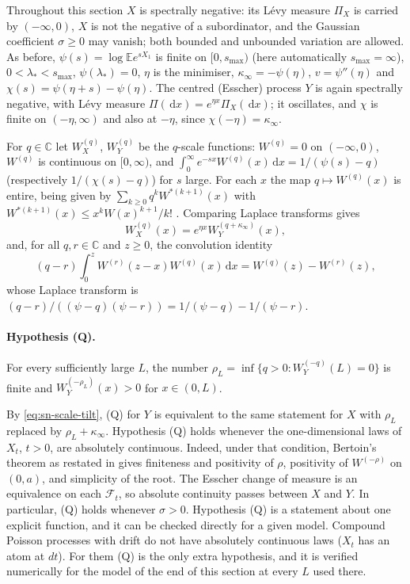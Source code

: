 \documentclass[11pt,a4paper]{article}
\theoremstyle{definition}
\theoremstyle{remark}
\newcommand{\E}{\mathbb E}
\newcommand{\1}{\mathbf 1}
\newcommand{\dd}{\,\mathrm d}
\begin{document}
Throughout this section $X$ is spectrally negative: its L\'evy measure $\Pi_X$ is carried by $(-\infty,0)$, $X$ is not the negative of a subordinator, and the Gaussian coefficient $\sigma\geq0$ may vanish; both bounded and unbounded variation are allowed. As before, $\psi(s)=\log\E e^{sX_1}$ is finite on $[0,s_{\max})$ (here automatically $s_{\max}=\infty$), $0<\lambda_*<s_{\max}$, $\psi(\lambda_*)=0$, $\eta$ is the minimiser, $\kappa_\infty=-\psi(\eta)$, $v=\psi''(\eta)$ and $\chi(s)=\psi(\eta+s)-\psi(\eta)$. The centred (Esscher) process $Y$ is again spectrally negative, with L\'evy measure $\Pi(\dd x)=e^{\eta x}\Pi_X(\dd x)$; it oscillates, and $\chi$ is finite on $(-\eta,\infty)$ and also at $-\eta$, since $\chi(-\eta)=\kappa_\infty$.

For $q\in\mathbb C$ let $W_X^{(q)}$, $W_Y^{(q)}$ be the $q$-scale functions: $W^{(q)}=0$ on $(-\infty,0)$, $W^{(q)}$ is continuous on $[0,\infty)$, and
$\int_0^\infty e^{-sx}W^{(q)}(x)\dd x=1/(\psi(s)-q)$ (respectively $1/(\chi(s)-q)$) for $s$ large. For each $x$ the map $q\mapsto W^{(q)}(x)$ is entire, being given by $\sum_{k\ge0}q^kW^{*(k+1)}(x)$ with $W^{*(k+1)}(x)\le x^kW(x)^{k+1}/k!$ \cite[\S2]{lambert}. Comparing Laplace transforms gives
\begin{equation}\label{eq:sn-scale-tilt}
 W_X^{(q)}(x)=e^{\eta x}W_Y^{(q+\kappa_\infty)}(x),
\end{equation}
and, for all $q,r\in\mathbb C$ and $z\ge0$, the convolution identity
\begin{equation}\label{eq:sn-conv}
 (q-r)\int_0^zW^{(r)}(z-x)W^{(q)}(x)\dd x=W^{(q)}(z)-W^{(r)}(z),
\end{equation}
whose Laplace transform is $(q-r)/((\psi-q)(\psi-r))=1/(\psi-q)-1/(\psi-r)$.

\paragraph{Hypothesis (Q).} For every sufficiently large $L$, the number
$\rho_L=\inf\{q>0:W_Y^{(-q)}(L)=0\}$ is finite and $W_Y^{(-\rho_L)}(x)>0$ for $x\in(0,L)$.

By \eqref{eq:sn-scale-tilt}, (Q) for $Y$ is equivalent to the same statement for $X$ with $\rho_L$ replaced by $\rho_L+\kappa_\infty$. Hypothesis (Q) holds whenever the one-dimensional laws of $X_t$, $t>0$, are absolutely continuous. Indeed, under that condition, Bertoin's theorem as restated in \cite[Theorem~2.1]{lambert} gives finiteness and positivity of $\rho$, positivity of $W^{(-\rho)}$ on $(0,a)$, and simplicity of the root. The Esscher change of measure is an equivalence on each $\mathcal F_t$, so absolute continuity passes between $X$ and $Y$. In particular, (Q) holds whenever $\sigma>0$. Hypothesis (Q) is a statement about one explicit function, and it can be checked directly for a given model. Compound Poisson processes with drift do not have absolutely continuous laws ($X_t$ has an atom at $dt$). For them (Q) is the only extra hypothesis, and it is verified numerically for the model of the end of this section at every $L$ used there.
\end{document}
